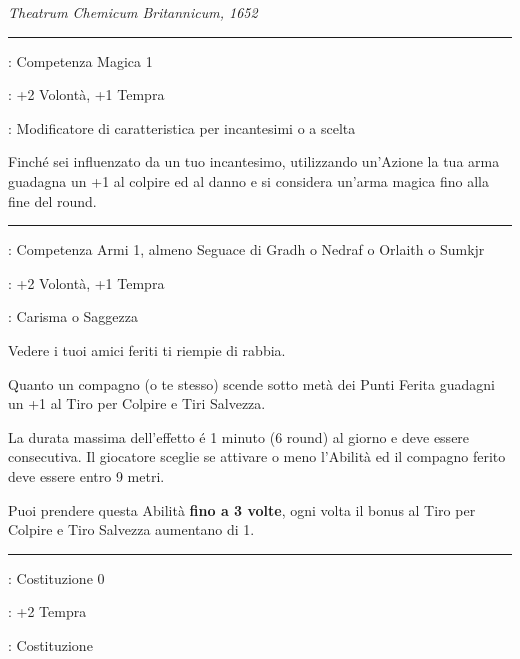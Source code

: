 \begin{multicols}{2}
\begin{center}
	\emph{Theatrum Chemicum Britannicum, 1652}
\end{center}

\smallskip\noindent\rule{\linewidth}{2pt} \hypertarget{Radici magiche}{}\medskip{}
\noindent
\begin{description}[noitemsep, topsep=0pt, parsep=0pt, partopsep=0pt, leftmargin=0cm, labelwidth=2.5cm]
    \item[\textbf{Requisito}]: Competenza Magica 1
    \item[\textbf{Tiri Salvezza}]: +2 Volontà, +1 Tempra
    \item[\textbf{Caratteristica}]: Modificatore di caratteristica per incantesimi o a scelta
\end{description}

Finché sei influenzato da un tuo incantesimo, utilizzando un'Azione la tua arma guadagna un +1 al colpire ed al danno e si considera un'arma magica fino alla fine del round.

\smallskip\noindent\rule{\linewidth}{2pt} \hypertarget{Rappresaglia}{}\medskip{}
\noindent
\begin{description}[noitemsep, topsep=0pt, parsep=0pt, partopsep=0pt, leftmargin=0cm, labelwidth=2.5cm]
    \item[\textbf{Requisito}]: Competenza Armi 1, almeno Seguace di Gradh o Nedraf o Orlaith o Sumkjr
    \item[\textbf{Tiri Salvezza}]: +2 Volontà, +1 Tempra
    \item[\textbf{Caratteristica}]: Carisma o Saggezza
\end{description}

Vedere i tuoi amici feriti ti riempie di rabbia.

Quanto un compagno (o te stesso) scende sotto metà dei Punti Ferita guadagni un +1 al Tiro per Colpire e Tiri Salvezza.

La durata massima dell'effetto é 1 minuto (6 round) al giorno e deve essere consecutiva. Il giocatore sceglie se attivare o meno l'Abilità ed il compagno ferito deve essere entro 9 metri.

Puoi prendere questa Abilità \textbf{fino a 3 volte}, ogni volta il bonus al Tiro per Colpire e Tiro Salvezza aumentano di 1.

\smallskip\noindent\rule{\linewidth}{2pt} \hypertarget{Recupero}{}\medskip{}
\noindent
\begin{description}[noitemsep, topsep=0pt, parsep=0pt, partopsep=0pt, leftmargin=0cm, labelwidth=2.5cm]
    \item[\textbf{Requisito}]: Costituzione 0
    \item[\textbf{Tiri Salvezza}]: +2 Tempra
    \item[\textbf{Caratteristica}]: Costituzione
\end{description}


\end{multicols}
